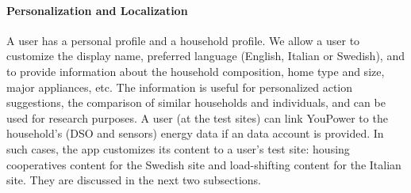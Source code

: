 \paragraph{Personalization and Localization}
A user has a personal profile and a household profile. We allow a user to customize the display name, preferred language (English, Italian or Swedish), and to provide information about the household composition, home type and size, major appliances, etc. The information is useful for personalized action suggestions, the comparison of similar households and individuals, and can be used for research purposes. A user (at the test sites) can link YouPower to the household's (DSO and sensors) energy data if an data account is provided. 
% 
In such cases, the app customizes its content to a user's test site: housing cooperatives content for the Swedish site and load-shifting content for the Italian site. They are discussed in the next two subsections. 


